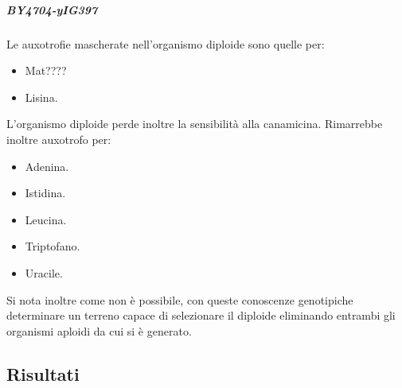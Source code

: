 				\subparagraph*{BY4704-yIG397}
				Le auxotrofie mascherate nell'organismo diploide sono quelle per:
				\begin{multicols}{2}
					\begin{itemize}
						\item Mat????
						\item Lisina.
					\end{itemize}
				\end{multicols}
				L'organismo diploide perde inoltre la sensibilit\`a alla canamicina.
				Rimarrebbe inoltre auxotrofo per:
				\begin{multicols}{2}
					\begin{itemize}
						\item Adenina.
						\item Istidina.
						\item Leucina.
						\item Triptofano.
						\item Uracile.
					\end{itemize}
				\end{multicols}
				Si nota inoltre come non \`e possibile, con queste conoscenze genotipiche determinare un terreno capace di selezionare il diploide eliminando entrambi gli organismi aploidi da cui si \`e generato.
	\subsection*{Risultati}
	
